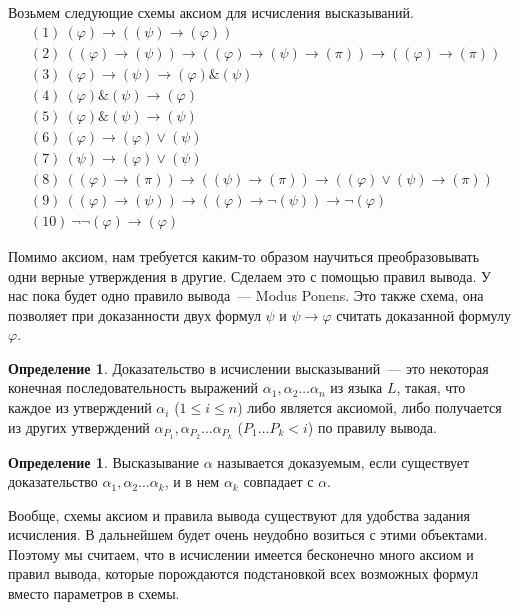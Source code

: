 \documentclass[a4paper,11pt]{article}
\theoremstyle{definition}
\newtheorem{dfn}[thm]{Определение}
\newcommand{\amp}{\mathbin{\&}}
\begin{document}
Возьмем следующие схемы аксиом для исчисления высказываний.
\begin{align*}
&(1)\ (\varphi) \to ((\psi) \to (\varphi))\\
&(2)\ ((\varphi) \to (\psi)) \to ((\varphi) \to (\psi) \to (\pi)) \to ((\varphi) \to (\pi))\\
&(3)\ (\varphi) \to (\psi) \to (\varphi) \amp (\psi)\\
&(4)\ (\varphi) \amp (\psi) \to (\varphi)\\
&(5)\ (\varphi) \amp (\psi) \to (\psi)\\
&(6)\ (\varphi) \to (\varphi) \vee (\psi)\\
&(7)\ (\psi) \to (\varphi) \vee (\psi)\\
&(8)\ ((\varphi) \to (\pi)) \to ((\psi) \to (\pi)) \to ((\varphi) \vee (\psi) \to (\pi))\\
&(9)\ ((\varphi) \to (\psi)) \to ((\varphi) \to \neg(\psi)) \to \neg(\varphi)\\
&(10)\ \neg\neg(\varphi) \to (\varphi)
\end{align*}

Помимо аксиом, нам требуется каким-то образом научиться преобразовывать одни
верные утверждения в другие. Сделаем это с помощью правил вывода. У нас пока
будет одно правило вывода~--- Modus Ponens. Это также схема, она позволяет при
доказанности двух формул $\psi$ и $\psi \to \varphi$ считать доказанной формулу
$\varphi$.

\begin{dfn}
Доказательство в исчислении высказываний~--- это некоторая конечная
последовательность выражений $\alpha_1, \alpha_2 \dots \alpha_n$ из языка $L$,
такая, что каждое из утверждений $\alpha_i$ ($1 \le i \le n$) либо является
аксиомой, либо получается из других утверждений
$\alpha_{P_1}, \alpha_{P_2} \dots \alpha_{P_k}$ ($P_1 \dots P_k < i$) по
правилу вывода.
\end{dfn}

\begin{dfn}
Высказывание $\alpha$ называется доказуемым, если существует доказательство
$\alpha_1, \alpha_2 \dots \alpha_k$, и в нем $\alpha_k$ совпадает с $\alpha$.
\end{dfn}

Вообще, схемы аксиом и правила вывода существуют для удобства задания
исчисления. В дальнейшем будет очень неудобно возиться с этими объектами.
Поэтому мы считаем, что в исчислении имеется бесконечно много аксиом и правил
вывода, которые порождаются подстановкой всех возможных формул вместо параметров
в схемы.
\end{document}
